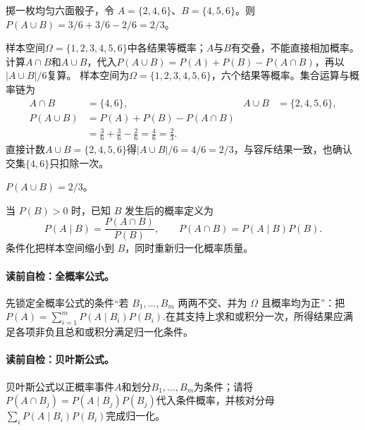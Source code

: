 \begin{example}[骰子事件并集的两种核验]\label{exm:V1-C04-dice}
掷一枚均匀六面骰子，令 $A=\{2,4,6\}$、$B=\{4,5,6\}$。则 $P(A\cup B)=3/6+3/6-2/6=2/3$。
\end{example}
\begin{solution}
\SolGiven 样本空间$\Omega=\{1,2,3,4,5,6\}$中各结果等概率；$A$与$B$有交叠，不能直接相加概率。
\SolPlan 计算$A\cap B$和$A\cup B$，代入$P(A\cup B)=P(A)+P(B)-P(A\cap B)$，再以$|A\cup B|/6$复算。
\SolDerive
样本空间为$\Omega=\{1,2,3,4,5,6\}$，六个结果等概率。集合运算与概率链为
\[
\begin{aligned}
A\cap B&=\{4,6\},
&A\cup B&=\{2,4,5,6\},\\
P(A\cup B)
&=P(A)+P(B)-P(A\cap B)\\
&=\frac36+\frac36-\frac26
=\frac46=\frac23.
\end{aligned}
\]
\SolCheck 直接计数$A\cup B=\{2,4,5,6\}$得$|A\cup B|/6=4/6=2/3$，与容斥结果一致，也确认交集$\{4,6\}$只扣除一次。

\SolAnswer $P(A\cup B)=2/3$。
\end{solution}
当 $P(B)>0$ 时，已知 $B$ 发生后的概率定义为
\[
P(A\mid B)=\frac{P(A\cap B)}{P(B)},\qquad
P(A\cap B)=P(A\mid B)P(B).
\]
条件化把样本空间缩小到 $B$，同时重新归一化概率质量。

\paragraph{读前自检：全概率公式。}先锁定全概率公式的条件“若 $B_1,\ldots,B_m$ 两两不交、并为 $\Omega$ 且概率均为正”：把$P(A)=\sum_{i=1}^{m}P(A\mid B_i)P(B_i).$在其支持上求和或积分一次，所得结果应满足各项非负且总和或积分满足归一化条件。\par
\paragraph{读前自检：贝叶斯公式。}贝叶斯公式以正概率事件$A$和划分$B_1,\ldots,B_m$为条件；请将$P(A\cap B_j)=P(A\mid B_j)P(B_j)$代入条件概率，并核对分母$\sum_iP(A\mid B_i)P(B_i)$完成归一化。\par

